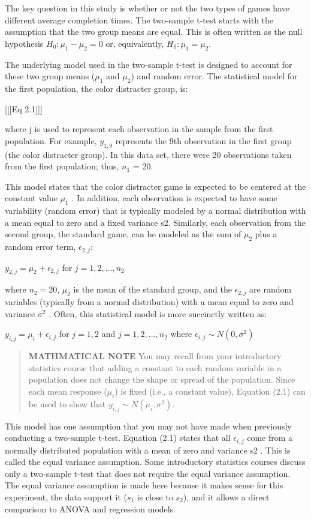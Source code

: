 \documentclass[
]{report}
\theoremstyle{definition}
\theoremstyle{definition}
\theoremstyle{definition}
\theoremstyle{definition}
\theoremstyle{remark}
\begin{document}
The key question in this study is whether or not the two types of games have different average completion times. The two-sample t-test starts with the assumption that the two group means are equal. This is often written as the null hypothesis \(H_0 : \mu_1 - \mu_2 = 0\) or, equivalently, \(H_0 : \mu_1 = \mu_2\).

The underlying model used in the two-sample t-test is designed to account for these two group means (\(\mu_1\) and \(\mu_2\)) and random error. The statistical model for the first population, the color distracter group, is:

{[}{[}{[}Eq 2.1{]}{]}{]}

where j is used to represent each observation in the sample from the first population. For example, \(y_{1, 9}\) represents the 9th observation in the first group (the color distracter group). In this data set, there were 20 observations taken from the first population; thus, \(n_1\) = 20.

This model states that the color distracter game is expected to be centered at the constant value \(\mu_1\) . In addition, each observation is expected to have some variability (random error) that is typically modeled by a normal distribution with a mean equal to zero and a fixed variance s2. Similarly, each observation from the second group, the standard game, can be modeled as the sum of \(\mu_2\) plus a random error term, \(\epsilon_{2, j}\):

\(y_{2, j} = \mu_2 + \epsilon_{2, j}\) for \(j = 1, 2, ... ,n_2\)

where \(n_2 = 20\), \(\mu_2\) is the mean of the standard group, and the \(\epsilon_{2, j}\) are random variables (typically from a
normal distribution) with a mean equal to zero and variance \(\sigma^2\) . Often, this statistical model is more succinctly written as:

\(y_{i, j} = \mu_i + \epsilon_{i, j}\) for \(j = 1, 2\) and \(j = 1, 2, ... ,n_2\) where \(\epsilon_{i, j} \sim N(0,\sigma^2)\)

\begin{quote}
\textbf{MATHMATICAL NOTE}
You may recall from your introductory statistics course that adding a constant to each random variable in a population does not change the shape or spread of the population. Since each mean response (\(\mu_i\)) is fixed (i.e., a constant value), Equation (2.1) can be used to show that \(y_{i, j} \sim N(\mu_i,\sigma^2)\).
\end{quote}

This model has one assumption that you may not have made when previously conducting a two-sample t-test. Equation (2.1) states that all \(\epsilon_{i, j}\) come from a normally distributed population with a mean of zero and
variance s2 . This is called the equal variance assumption. Some introductory statistics courses discuss only a two-sample t-test that does not require the equal variance assumption. The equal variance assumption is
made here because it makes sense for this experiment, the data support it (\(s_1\) is close to \(s_2\)), and it allows a direct comparison to ANOVA and regression models.
\end{document}
